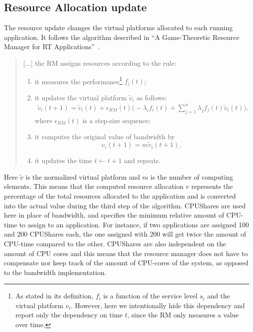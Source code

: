 \documentclass[nobiblatex]{LTHthesis}
\begin{document}
\subsection{Resource Allocation update}

The resource update changes the virtual platforms allocated to each running
application. It follows the algorithm described in 
``A Game-Theoretic Resource Manager for RT Applications''~\cite[page 4]{gtrm}.

\begin{quotation}
	[...] the RM assigns resources according to the rule:
	\begin{enumerate}
	\item it measures the performance\footnote{As stated in its definition, 
    $f_i$ is a function of the service level $s_i$ and the virtual platform 
    $v_i$. However, here we intentionally hide this dependency and report 
    only the dependency on time $t$, since the RM only measures a value 
    over time.} $f_i(t)$;  
	\item it updates the virtual platform $\tilde{v}_{i}$ as follows:
		\begin{multline}
		  \tilde{v}_i(t+1) = \tilde{v}_i(t) + 
                         \epsilon_{ RM}(t)\Big(- \lambda_i f_i(t) + 
                         \sum_{j=1}^n \lambda_j f_j(t) \tilde{v}_i(t)\Big),
		  \label{eq:RecursionForResources}
		\end{multline}
		where $\epsilon_{ RM}(t)$ is a step-size sequence;
	\item it computes the original value of bandwidth by 
    $$v_i(t+1) = m \tilde{v}_i(t+1),$$
	\item it updates the time $t\leftarrow t+1$ and repeats.
	\end{enumerate}
\end{quotation}

Here $\tilde{v}$ is the normalized virtual platform and $m$ is the number
of computing elements. This means that the computed resource allocation $v$
represents the percentage of the total resources allocated to the application
and is converted into the actual value during the third step of the
algorithm. CPUShares are used here in place of bandwidth, and specifies the minimum relative amount of CPU-time to assign to an application. For instance, if two applications are assigned 100 and 200 CPUShares each, the one assigned with 200 will get twice the amount of CPU-time compared to the other. CPUShares are also independent on the amount of CPU cores and this means that the resource manager does not have to compensate nor keep track of the amount of CPU-cores of the system, as opposed to the bandwidth implementation.
\end{document}
